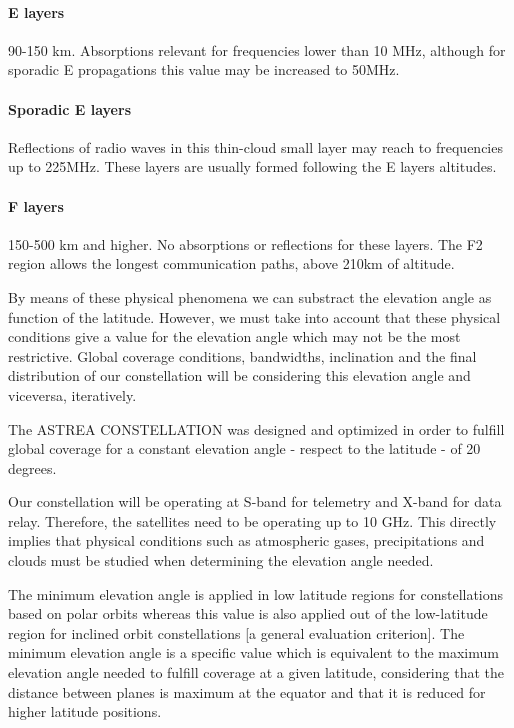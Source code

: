 \paragraph{E layers} 90-150 km. Absorptions relevant for frequencies lower than 10 MHz, although for sporadic E propagations this value may be increased to 50MHz.

\paragraph{Sporadic E layers} Reflections of radio waves in this thin-cloud small layer may reach to frequencies up to 225MHz. These layers are usually formed following the E layers altitudes.

\paragraph{F layers} 150-500 km and higher. No absorptions or reflections for these layers. The F2 region allows the longest communication paths, above 210km of altitude.

By means of these physical phenomena we can substract the elevation angle as function of the latitude. However, we must take into account that these physical conditions give a value for the elevation angle which may not be the most restrictive. Global coverage conditions, bandwidths, inclination and the final distribution of our constellation will be considering this elevation angle and viceversa, iteratively.

The ASTREA CONSTELLATION was designed and optimized in order to fulfill global coverage for a constant elevation angle - respect to the latitude - of 20 degrees.

Our constellation will be operating at S-band for telemetry and X-band for data relay. Therefore, the satellites need to be operating up to 10 GHz. This directly implies that physical conditions such as atmospheric gases, precipitations and clouds must be studied when determining the elevation angle needed.

The minimum elevation angle is applied in low latitude regions for constellations based on polar orbits whereas this value is also applied out of the low-latitude region for inclined orbit constellations [a general evaluation criterion]. The minimum elevation angle is a specific value which is equivalent to the maximum elevation angle needed to fulfill coverage at a given latitude, considering that the distance between planes is maximum at the equator and that it is reduced for higher latitude positions.

